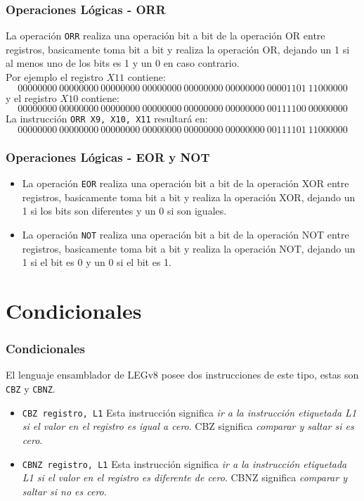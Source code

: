 \documentclass[aspectradio=43]{beamer}
\begin{document}
\begin{frame}
    \frametitle{Operaciones Lógicas - ORR}
    La operación \texttt{ORR} realiza una operación bit a bit de la operación OR entre registros, basicamente toma bit a bit y realiza la operación OR, dejando un 1 si al menos uno de los bits es 1 y un 0 en caso contrario.\\
    Por ejemplo el registro \(X11\) contiene:
    \begin{equation*}
        \scriptstyle
        00000000\ 00000000\ 00000000\ 00000000\ 00000000\ 00000000\ 00001101\ 11000000
    \end{equation*}
    y el registro \(X10\) contiene:
    \begin{equation*}
        \scriptstyle
        00000000\ 00000000\ 00000000\ 00000000\ 00000000\ 00000000\ 00111100\ 00000000
    \end{equation*}
    La instrucción \texttt{ORR X9, X10, X11} resultará en:
    \begin{equation*}
        \scriptstyle
        00000000\ 00000000\ 00000000\ 00000000\ 00000000\ 00000000\ 00111101\ 11000000
    \end{equation*}
\end{frame}

\begin{frame}
    \frametitle{Operaciones Lógicas - EOR y NOT}
    \begin{itemize}
        \item La operación \texttt{EOR} realiza una operación bit a bit de la operación XOR entre registros, basicamente toma bit a bit y realiza la operación XOR, dejando un 1 si los bits son diferentes y un 0 si son iguales.\\
        \item La operación \texttt{NOT} realiza una operación bit a bit de la operación NOT entre registros, basicamente toma bit a bit y realiza la operación NOT, dejando un 1 si el bit es 0 y un 0 si el bit es 1.
    \end{itemize}
\end{frame}

\section{Condicionales}
\begin{frame}
    \frametitle{Condicionales}
    El lenguaje ensamblador de LEGv8 posee dos instrucciones de este tipo, estas son \texttt{CBZ} y \texttt{CBNZ}.
    \begin{itemize}
        \item \texttt{CBZ registro, L1} Esta instrucción significa \textit{ir a la instrucción etiquetada L1 si el valor en el registro es igual a cero}. CBZ significa \textit{comparar y saltar si es cero}.
        \item \texttt{CBNZ registro, L1} Esta instrucción significa \textit{ir a la instrucción etiquetada L1 si el valor en el registro es diferente de cero}. CBNZ significa \textit{comparar y saltar si no es cero}.
    \end{itemize}
\end{frame}
\end{document}
